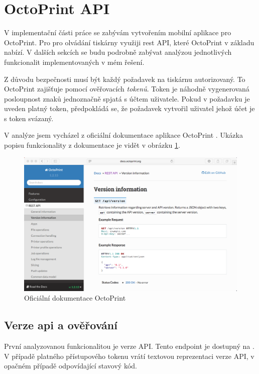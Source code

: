 \section{OctoPrint API}\label{analyza-api}

V implementační části práce se zabývám vytvořením mobilní aplikace pro OctoPrint.
Pro pro olvádání tiskárny využiji \acrshort{rest} API, které OctoPrint v základu nabízí.
V dalších sekcích se budu podrobně zabývat analýzou jednotlivých funkcionalit implementovaných v mém řešení.

Z důvodu bezpečnosti musí být každý požadavek na tiskárnu autorizovaný.
To OctoPrint zajišťuje pomocí ověřovacích \textit{tokenů}.
Token je náhodně vygenerovaná posloupnost znaků jednoznačně spjatá s účtem uživatele.
Pokud v požadavku je uveden platný token, předpokládá se, že požadavek vytvořil uživatel jehož účet je s token svázaný.

V analýze jsem vycházel z oficiální dokumentace aplikace OctoPrint \cite{octoprint-docs}.
Ukázka popisu funkcionality z dokumentace je vidět v obrázku \ref{fig:octoprint-docs}.

\begin{figure}\centering
	\includegraphics[width=\textwidth]{assets/analysis-octoprintapi-web.png}
	\caption{Oficiální dokumentace OctoPrint}\label{fig:octoprint-docs}
\end{figure}

\subsection{Verze \acrshort{api} a ověřování}

První analyzovanou funkcionalitou je verze API.
Tento endpoint je dostupný na .
V případě platného přístupového tokenu vrátí textovou reprezentaci verze API, v opačném případě odpovídající stavový kód.

